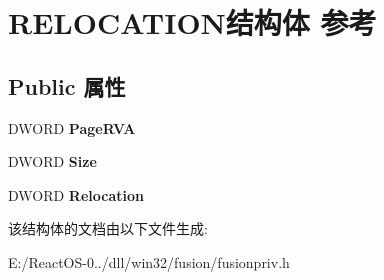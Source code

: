 \hypertarget{struct_r_e_l_o_c_a_t_i_o_n}{}\section{R\+E\+L\+O\+C\+A\+T\+I\+O\+N结构体 参考}
\label{struct_r_e_l_o_c_a_t_i_o_n}
\subsection*{Public 属性}
\begin{DoxyCompactItemize}
\item 
\mbox{\label{struct_r_e_l_o_c_a_t_i_o_n_a50d343fcd525d2be8ab496a6ac1ea85c}} 
D\+W\+O\+RD {\bfseries Page\+R\+VA}
\item 
\mbox{\label{struct_r_e_l_o_c_a_t_i_o_n_a26c1d02fd70c46e16e1a15a53b390906}} 
D\+W\+O\+RD {\bfseries Size}
\item 
\mbox{\label{struct_r_e_l_o_c_a_t_i_o_n_a8e817d9b03c9f95155718a01e4e5fb11}} 
D\+W\+O\+RD {\bfseries Relocation}
\end{DoxyCompactItemize}


该结构体的文档由以下文件生成\+:\begin{DoxyCompactItemize}
\item 
E\+:/\+React\+O\+S-\/0../dll/win32/fusion/fusionpriv.\+h\end{DoxyCompactItemize}
